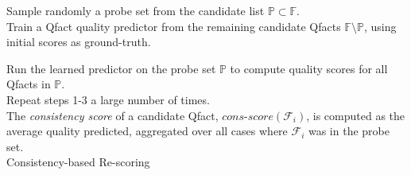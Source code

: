 
\begin{algorithm}[t]
\DontPrintSemicolon
{}
\Input{\ Candidate Qfacts $\mathbb{F} = \{\mathcal{F}_1, \mathcal{F}_2, ... | \mathcal{F}_i = (e_i,q_i,X_i)\}$\\
with initial scores for Qquery $\mathcal{Q} = (qt,qq,qX)$}


Sample randomly a probe set from the candidate list $\mathbb{P} \subset \mathbb{F}$. \\

Train a Qfact quality predictor from the remaining candidate Qfacts $\mathbb{F} \setminus \mathbb{P}$, using initial scores as ground-truth.

Run the learned predictor on the probe set $\mathbb{P}$
to compute quality scores for all Qfacts in $\mathbb{P}$.\\

Repeat steps 1-3 a large number of times.\\

The {\em consistency score} of a candidate Qfact, $\textit{cons-score}(\mathcal{F}_i)$, is computed as the average quality predicted, aggregated over all cases where $\mathcal{F}_i$ was in the probe set.\\
\caption{Consistency-based Re-scoring}
\label{algor:2}
\end{algorithm}
